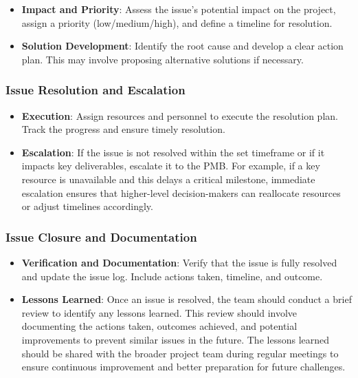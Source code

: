 \documentclass[a4paper,12pt]{article}
\begin{document}
\begin{itemize}[left=1em, itemsep=0pt, topsep=0pt] 
    \item \textbf{Impact and Priority}: Assess the issue’s potential impact on the project, assign a priority (low/medium/high), and define a timeline for resolution. 
    \item \textbf{Solution Development}: Identify the root cause and develop a clear action plan. This may involve proposing alternative solutions if necessary.
\end{itemize}

\subsubsection*{Issue Resolution and Escalation} 

\begin{itemize}[left=1em, itemsep=0pt, topsep=0pt] 
    \item \textbf{Execution}: Assign resources and personnel to execute the resolution plan. Track the progress and ensure timely resolution.
    \item \textbf{Escalation}: If the issue is not resolved within the set timeframe or if it impacts key deliverables, escalate it to the PMB. For example, if a key resource is unavailable and this delays a critical milestone, immediate escalation ensures that higher-level decision-makers can reallocate resources or adjust timelines accordingly.
\end{itemize}

\subsubsection*{Issue Closure and Documentation} 

\begin{itemize}[left=1em, itemsep=0pt, topsep=0pt] 
    \item \textbf{Verification and Documentation}: Verify that the issue is fully resolved and update the issue log. Include actions taken, timeline, and outcome. 
    \item \textbf{Lessons Learned}: Once an issue is resolved, the team should conduct a brief review to identify any lessons learned. This review should involve documenting the actions taken, outcomes achieved, and potential improvements to prevent similar issues in the future. The lessons learned should be shared with the broader project team during regular meetings to ensure continuous improvement and better preparation for future challenges.
\end{itemize}
\end{document}
